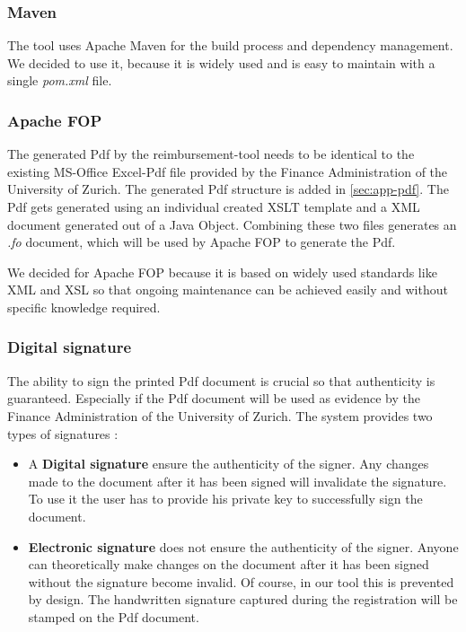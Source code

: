 \subsubsection{Maven}
The tool uses Apache Maven \cite{maven} for the build process and dependency management. We decided to use it, because it is widely used and is easy to maintain with a single \textit{pom.xml} file.

\subsubsection{Apache FOP}
The generated Pdf by the reimbursement-tool needs to be identical to the existing MS-Office Excel-Pdf file provided by the Finance Administration of the University of Zurich. The generated Pdf structure is added in \ref{sec:app-pdf}.\newline
The Pdf gets generated using an individual created XSLT template and a XML document generated out of a Java Object. Combining these two files generates an \textit{.fo} document, which will be used by Apache FOP \cite{apache-fop} to generate the Pdf.\par
We decided for Apache FOP because it is based on widely used standards like XML and XSL so that ongoing maintenance can be achieved easily and without specific knowledge required.

\subsubsection{Digital signature}
The ability to sign the printed Pdf document is crucial so that authenticity is guaranteed. Especially if the Pdf document will be used as evidence by the Finance Administration of the University of Zurich. The system provides two types of signatures \cite{arx-signature}:
\begin{itemize}
	\item A \textbf{Digital signature} ensure the authenticity of the signer. Any changes made to the document after it has been signed will invalidate the signature. To use it the user has to provide his private key to successfully sign the document.
	\item \textbf{Electronic signature} does not ensure the authenticity of the signer. Anyone can theoretically make changes on the document after it has been signed without the signature become invalid. Of course, in our tool this is prevented by design. The handwritten signature captured during the registration will be stamped on the Pdf document.
\end{itemize}\par

